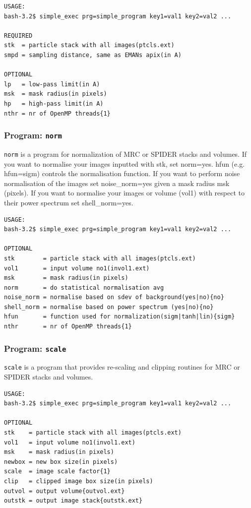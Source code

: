 \documentclass[a4paper,11pt]{article}
\newcommand{\prgname}[1]{\textcolor{NavyBlue}{\texttt{#1}}}
\begin{document}
\begin{verbatim}
USAGE:
bash-3.2$ simple_exec prg=simple_program key1=val1 key2=val2 ...

REQUIRED
stk  = particle stack with all images(ptcls.ext)
smpd = sampling distance, same as EMANs apix(in A)

OPTIONAL
lp   = low-pass limit(in A)
msk  = mask radius(in pixels)
hp   = high-pass limit(in A)
nthr = nr of OpenMP threads{1}
\end{verbatim}

\subsubsection{Program: \prgname{norm}}
\label{norm}
\prgname{norm} is a program for normalization of MRC or SPIDER stacks and volumes. If you want to normalise your images inputted with stk, set norm=yes. hfun (e.g. hfun=sigm) controls the normalisation function. If you want to perform noise normalisation of the images set noise\_norm=yes given a mask radius msk (pixels). If you want to normalise your images or volume (vol1) with respect to their power spectrum set shell\_norm=yes.

\begin{verbatim}
USAGE:
bash-3.2$ simple_exec prg=simple_program key1=val1 key2=val2 ...

OPTIONAL
stk        = particle stack with all images(ptcls.ext)
vol1       = input volume no1(invol1.ext)
msk        = mask radius(in pixels)
norm       = do statistical normalisation avg
noise_norm = normalise based on sdev of background(yes|no){no}
shell_norm = normalise based on power spectrum (yes|no){no}
hfun       = function used for normalization(sigm|tanh|lin){sigm}
nthr       = nr of OpenMP threads{1}
\end{verbatim}

\subsubsection{Program: \prgname{scale}}
\label{scale}
\prgname{scale} is a program that provides re-scaling and clipping routines for MRC or SPIDER stacks and volumes.

\begin{verbatim}
USAGE:
bash-3.2$ simple_exec prg=simple_program key1=val1 key2=val2 ...

OPTIONAL
stk    = particle stack with all images(ptcls.ext)
vol1   = input volume no1(invol1.ext)
msk    = mask radius(in pixels)
newbox = new box size(in pixels)
scale  = image scale factor{1}
clip   = clipped image box size(in pixels)
outvol = output volume{outvol.ext}
outstk = output image stack{outstk.ext}
\end{verbatim}
\end{document}

